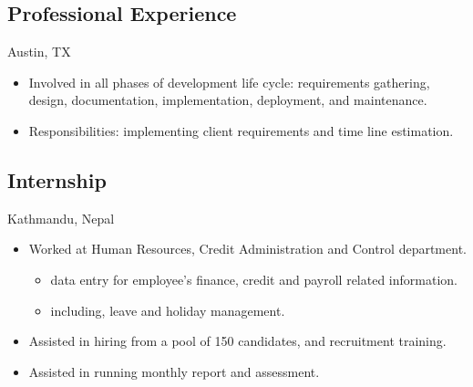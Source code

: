 \documentclass[11pt,letterpaper,sans]{moderncv}
\begin{document}
   \subsection{Professional Experience}

           {Austin, TX}{}
           {\begin{itemize}
             \item Involved in all phases of development life cycle:
               requirements gathering, design, documentation,
               implementation, deployment, and maintenance.
             \item Responsibilities: implementing client requirements
               and time line estimation.
           \end{itemize}}


   \subsection{Internship}

           {Kathmandu, Nepal}{}
           {\begin{itemize}
             \item Worked at Human Resources, Credit Administration and
               Control department.
               {\begin{itemize}
                 \item data entry for employee's finance, credit and
                   payroll related information.
                 \item including, leave and holiday management.
               \end{itemize}}
             \item Assisted in hiring from a pool of 150 candidates,
               and recruitment training.
             \item Assisted in running monthly report and assessment.
           \end{itemize}}


\end{document}
